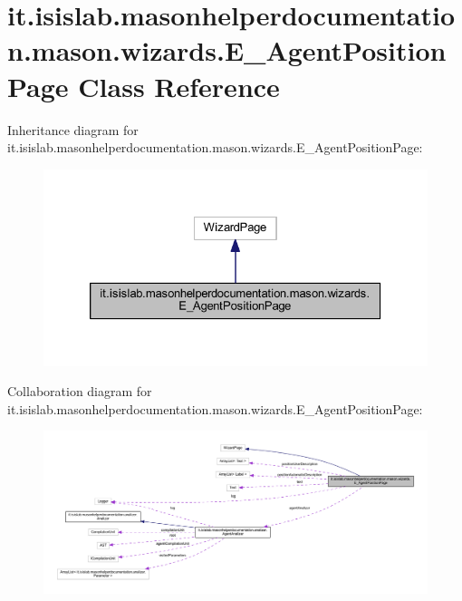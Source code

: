 \hypertarget{classit_1_1isislab_1_1masonhelperdocumentation_1_1mason_1_1wizards_1_1_e___agent_position_page}{\section{it.\-isislab.\-masonhelperdocumentation.\-mason.\-wizards.\-E\-\_\-\-Agent\-Position\-Page Class Reference}
\label{classit_1_1isislab_1_1masonhelperdocumentation_1_1mason_1_1wizards_1_1_e___agent_position_page}
}


Inheritance diagram for it.\-isislab.\-masonhelperdocumentation.\-mason.\-wizards.\-E\-\_\-\-Agent\-Position\-Page\-:
\nopagebreak
\begin{figure}[H]
\begin{center}
\leavevmode
\includegraphics[width=326pt]{classit_1_1isislab_1_1masonhelperdocumentation_1_1mason_1_1wizards_1_1_e___agent_position_page__inherit__graph}
\end{center}
\end{figure}


Collaboration diagram for it.\-isislab.\-masonhelperdocumentation.\-mason.\-wizards.\-E\-\_\-\-Agent\-Position\-Page\-:
\nopagebreak
\begin{figure}[H]
\begin{center}
\leavevmode
\includegraphics[width=350pt]{classit_1_1isislab_1_1masonhelperdocumentation_1_1mason_1_1wizards_1_1_e___agent_position_page__coll__graph}
\end{center}
\end{figure}
